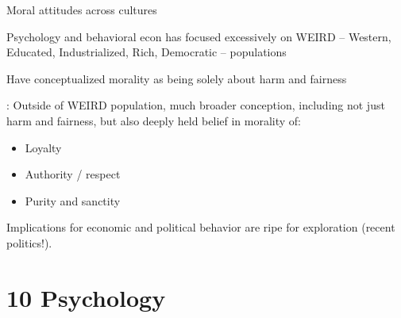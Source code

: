 \documentclass[aspectratio=169, 10pt, handout]{beamer}
\newenvironment{wideitemize}{\itemize\addtolength{\itemsep}{10pt}}{\enditemize}
\begin{document}
\begin{frame}{Moral attitudes across cultures}

\begin{wideitemize}

	\item Psychology and behavioral econ has focused excessively on WEIRD -- Western, Educated, Industrialized, Rich, Democratic -- populations \cite{henrich2010markets}
	
	\item Have conceptualized morality as being solely about harm and fairness

	\item \cite{haidt2012righteous}: Outside of WEIRD population, much broader conception, including not just harm and fairness, but also deeply held belief in morality of:
	
	\begin{itemize}

		\item Loyalty

		\item Authority / respect

		\item Purity and sanctity 

	\end{itemize}

	\item Implications for economic and political behavior are ripe for exploration (recent politics!).

	
\end{wideitemize}

\end{frame}

\section{10 Psychology}
\end{document}
